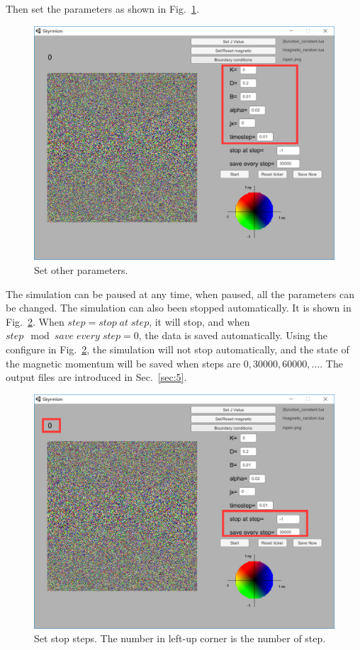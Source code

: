 \documentclass[aps,superscriptaddress,groupedaddress]{revtex4}  %
\begin{document}
Then set the parameters as shown in Fig.~\ref{Fig:intro2}.
\begin{figure}
\includegraphics[scale=0.3]{intro2.png}
\caption{\label{Fig:intro2}Set other parameters.}
\end{figure}

The simulation can be paused at any time, when paused, all the parameters can be changed. The simulation can also been stopped automatically. It is shown in Fig.~\ref{Fig:intro3}. When $step = stop\;at\;step$, it will stop, and when $step \mod save\;every\;step=0$, the data is saved automatically. Using the configure in Fig.~\ref{Fig:intro3}, the simulation will not stop automatically, and the state of the magnetic momentum will be saved when steps are $0,30000,60000,\ldots$. The output files are introduced in Sec.~\ref{sec:5}.
\begin{figure}
\includegraphics[scale=0.3]{intro3.png}
\caption{\label{Fig:intro3}Set stop steps. The number in left-up corner is the number of step.}
\end{figure}
\end{document}
